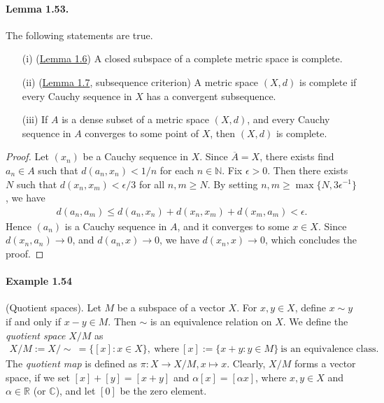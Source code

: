 \documentclass{article}
\renewcommand{\proofname}{\textit{Proof}}
\begin{document}
\paragraph{Lemma 1.53.\label{lemma:1.53}} The following statements are true.
\begin{itemize}
	\item[(i)] (\hyperref[lemma:1.6]{Lemma 1.6}) A closed subspace of a complete metric space is complete.
	\vspace{0.1cm}
	\item[(ii)] (\hyperref[lemma:1.7]{Lemma 1.7}, subsequence criterion) A metric space $(X,d)$ is complete if every Cauchy sequence in $X$ has a convergent subsequence.
	\vspace{0.1cm}
	\item[(iii)] If $A$ is a dense subset of a metric space $(X,d)$, and every Cauchy sequence in $A$ converges to some point of $X$, then $(X,d)$ is complete.
\end{itemize} 
\renewcommand{\proofname}{Proof of (iii)}
\begin{proof}
	Let $(x_n)$ be a Cauchy sequence in $X$. Since $\overline{A}=X$, there exists find $a_n\in A$ such that $d(a_n,x_n)<1/n$ for each $n\in\mathbb{N}$. Fix $\epsilon > 0$. Then there exists $N$ such that $d(x_n,x_m)<\epsilon/3$ for all $n,m\geq N$. By setting $n,m\geq\max\{N,3\epsilon^{-1}\}$, we have
	\begin{align*}
		d(a_n,a_m) \leq d(a_n,x_n) + d(x_n,x_m) + d(x_m,a_m) < \epsilon.
	\end{align*}
	Hence $(a_n)$ is a Cauchy sequence in $A$, and it converges to some $x\in X$. Since $d(x_n,a_n)\to 0$, and $d(a_n,x)\to 0$, we have $d(x_n,x)\to 0$, which concludes the proof.
\end{proof}
\renewcommand{\proofname}{Proof}

\paragraph{Example 1.54\label{example:1.54}} (Quotient spaces). Let $M$ be a subspace of a vector $X$. For $x,y\in X$, define $x\sim y$ if and only if $x-y\in M$. Then $\sim$ is an equivalence relation on $X$. We define the \textit{quotient space} $X/M$ as
\begin{align*}
	X/M := X/\sim\  = \{[x]:x\in X\},\ \text{where}\ [x] := \{x+y:y\in M\}\ \text{is an equivalence class.}
\end{align*}
The \textit{quotient map} is defined as $\pi:X\to X/M,x\mapsto x$. Clearly, $X/M$ forms a vector space, if we set $[x]+[y]=[x+y]$ and $\alpha[x]=[\alpha x]$, where $x,y\in X$ and $\alpha\in\mathbb{R}$ (or $\mathbb{C}$), and let $[0]$ be the zero element.
\vspace{0.1cm}
\end{document}
